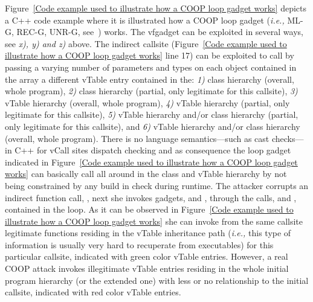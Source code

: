 Figure~\ref{Code example used to illustrate how a COOP loop gadget works}
depicts a C++ code example where it is illustrated how a COOP loop gadget 
(\textit{i.e.,} ML-G, REC-G, UNR-G, see~\cite{crane:readactor++}) works.
The vfgadget  can be exploited in several ways, see \textit{x), y) and z)} above.
The indirect callsite (Figure~\ref{Code example used to illustrate how a COOP loop gadget works} line 17) can be exploited 
to call by passing a varying number of parameters and types
on each object contained in the array a different
vTable entry contained in the:
\textit{1)} class hierarchy (overall, whole program),
\textit{2)} class hierarchy (partial, only legitimate for this callsite),
\textit{3)} vTable hierarchy (overall, whole program),
\textit{4)} vTable hierarchy (partial, only legitimate for this callsite),
\textit{5)} vTable hierarchy and/or class hierarchy (partial, only legitimate for this callsite), and
\textit{6)} vTable hierarchy and/or class hierarchy (overall, whole program).
There is no language semantics---such as cast checks---in C++ for vCall sites dispatch checking and as consequence
the loop gadget indicated in Figure~\ref{Code example used to illustrate how a COOP loop gadget works}
can basically call all around in the class and vTable hierarchy by not being constrained by any build in check during
runtime. The attacker corrupts an indirect function call, , 
next she invokes gadgets,   and , 
through the calls,  and , contained in the loop. 
As it can be observed in Figure~\ref{Code example used to illustrate how a COOP loop gadget works} she 
can invoke from the same callsite legitimate functions residing in the vTable inheritance path
(\textit{i.e.,} this type of information is usually very hard to recuperate from executables)
for this particular callsite, indicated with green color vTable entries. 
However, a real COOP attack invokes illegitimate
vTable entries residing in the whole initial program hierarchy (or the extended one)
with less or no relationship to the initial callsite,
indicated with red color vTable entries.

